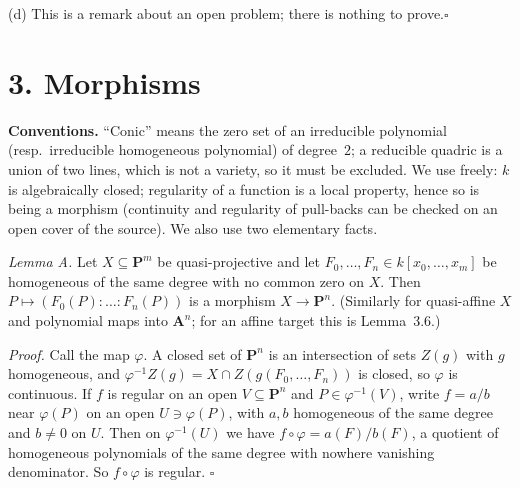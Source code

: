 \documentclass[11pt]{article}
\begin{document}
(d) This is a remark about an open problem; there is nothing to prove.\hfill$\square$

\section*{3. Morphisms}

\pf
\textbf{Conventions.} ``Conic'' means the zero set of an irreducible polynomial (resp.\ irreducible homogeneous polynomial) of degree~$2$; a reducible quadric is a union of two lines, which is not a variety, so it must be excluded. We use freely: $k$ is algebraically closed; regularity of a function is a local property, hence so is being a morphism (continuity and regularity of pull-backs can be checked on an open cover of the source). We also use two elementary facts.

\emph{Lemma A.} Let $X\subseteq\mathbf P^m$ be quasi-projective and let $F_0,\dots,F_n\in k[x_0,\dots,x_m]$ be homogeneous of the same degree with no common zero on $X$. Then $P\mapsto(F_0(P):\dots:F_n(P))$ is a morphism $X\to\mathbf P^n$. (Similarly for quasi-affine $X$ and polynomial maps into $\mathbf A^n$; for an affine target this is Lemma~3.6.)

\emph{Proof.} Call the map $\varphi$. A closed set of $\mathbf P^n$ is an intersection of sets $Z(g)$ with $g$ homogeneous, and $\varphi^{-1}Z(g)=X\cap Z(g(F_0,\dots,F_n))$ is closed, so $\varphi$ is continuous. If $f$ is regular on an open $V\subseteq\mathbf P^n$ and $P\in\varphi^{-1}(V)$, write $f=a/b$ near $\varphi(P)$ on an open $U\ni\varphi(P)$, with $a,b$ homogeneous of the same degree and $b\ne0$ on $U$. Then on $\varphi^{-1}(U)$ we have $f\circ\varphi=a(F)/b(F)$, a quotient of homogeneous polynomials of the same degree with nowhere vanishing denominator. So $f\circ\varphi$ is regular. $\square$
\end{document}

